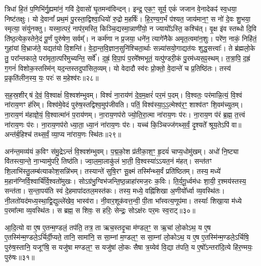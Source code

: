 त्रिधा॑ हि॒तं प॒णिभि॑र्गु॒ह्यमा॑नं॒ गवि॑ दे॒वासो॑ घृ॒तमन्व॑विन्दन्। 
इन्द्र॒ एक॒ꣳ॒ सूर्य॒ एकं॑ जजान वे॒नादेकꣴ॑ स्व॒धया॒ निष्ट॑तक्षुः। 
यो दे॒वानां᳚ प्रथ॒मं पु॒रस्ता॒द्विश्वा॒धियो॑ रु॒द्रो म॒हर्\mbox{}षिः॑। 
हि॒र॒ण्य॒ग॒र्भं प॑श्यत॒ जाय॑मान॒ꣳ॒ स नो॑ दे॒वः शु॒भया॒ स्मृत्या॒ संयु॑नक्तु। 
यस्मा॒त्परं॒ नाप॑र॒मस्ति॒ किञ्चि॒द्यस्मा॒न्नाणी॑यो॒ न ज्यायो᳚ऽस्ति॒ कश्चि॑त्। 
वृ॒क्ष इ॑व स्तब्धो दि॒वि ति॑ष्ठ॒त्येक॒स्तेने॒दं पू॒र्णं पुरु॑षेण॒ सर्वम्᳚। 
न कर्म॑णा न प्र॒जया॒ धने॑न॒ त्यागे॑नैके अमृत॒त्वमा॑न॒शुः। 
परे॑ण॒ नाकं॒ निहि॑तं॒ गुहा॑यां वि॒भ्राज॑ते॒ यद्यत॑यो वि॒शन्ति॑। 
वे॒दा॒न्त॒वि॒ज्ञान॒सुनि॑श्चिता॒र्थाः सन्न्या॑सयो॒गाद्यत॑यः शुद्ध॒सत्त्वाः᳚। 
ते ब्र॑ह्मलो॒के तु॒ परा᳚न्तकाले॒ परा॑मृता॒त्परि॑मुच्यन्ति॒ सर्वे᳚। 
द॒ह्रं॒ वि॒पा॒पं प॒रमे᳚श्मभूतं॒ यत्पु॑ण्डरी॒कं पु॒रम॑ध्यस॒ꣴ॒स्थम्। 
त॒त्रा॒पि॒ द॒ह्रं ग॒गनं॑ विशोक॒स्तस्मि॑न् यद॒न्तस्तदुपा॑सित॒व्यम्। 
यो वेदादौ स्व॑रः प्रो॒क्तो॒ वे॒दान्ते॑ च प्र॒तिष्ठि॑तः। 
तस्य॑ प्र॒कृति॑लीन॒स्य॒ यः॒ परः॑ स म॒हेश्व॑रः॥२८॥
\anuvakamend

स॒ह॒स्र॒शीर्‌षं दे॒वं॒ वि॒श्वाक्षं॑ वि॒श्वश॑म्भुवम्। 
विश्वं॑ ना॒राय॑णं दे॒व॒म॒क्षरं॑ पर॒मं प॒दम्। 
वि॒श्वतः॒ पर॑मान्नि॒त्यं॒ वि॒श्वं ना॑राय॒णꣳ ह॑रिम्। 
विश्व॑मे॒वेदं पुरु॑ष॒स्तद्विश्व॒मुप॑जीवति। 
पतिं॒ विश्व॑स्या॒ऽ॒ऽ॒त्मेश्व॑र॒ꣳ॒ शाश्व॑तꣳ शि॒वम॑च्युतम्। 
ना॒राय॒णं म॑हाज्ञे॒यं॒ वि॒श्वात्मा॑नं प॒राय॑णम्। 
ना॒राय॒णप॑रो ज्यो॒ति॒रा॒त्मा ना॑राय॒णः प॑रः। 
ना॒राय॒ण प॑रं ब्र॒ह्म॒ त॒त्त्वं ना॑राय॒णः प॑रः। 
ना॒राय॒णप॑रो ध्या॒ता॒ ध्या॒नं ना॑राय॒णः प॑रः। 
यच्च॑ कि॒ञ्चिज्ज॑गथ्स॒र्वं॒ दृ॒श्यते᳚ श्रूय॒तेऽपि॑ वा॥ 
अन्त॑र्ब॒हिश्च॑ तथ्स॒र्वं॒ व्या॒प्य ना॑राय॒णः स्थि॑तः॥२९॥

अन॑न्त॒मव्य॑यं क॒विꣳ स॑मु॒द्रेऽन्तं॑ वि॒श्वश॑म्भुवम्। 
प॒द्म॒को॒श प्र॑तीका॒श॒ꣳ॒ हृ॒दयं॑ चाप्य॒धोमु॑खम्। 
अधो॑ नि॒ष्ट्या वि॑तस्त्या॒न्ते॒ ना॒भ्यामु॑परि॒ तिष्ठ॑ति। 
ज्वा॒ल॒मा॒लाकु॑लं भा॒ती॒ वि॒श्वस्या॑ऽऽयत॒नं म॑हत्। 
सन्त॑तꣳ शि॒लाभि॑स्तु॒\-लम्ब॑त्याकोश॒सन्नि॑भम्। 
तस्यान्ते॑ सुषि॒रꣳ सू॒क्ष्मं तस्मि᳚न्थ्स॒र्वं प्रति॑ष्ठितम्। 
तस्य॒ मध्ये॑ म॒हान॑\-ग्निर्वि॒श्वार्चि॑र्वि॒श्वतो॑मुखः। 
सोऽग्र॑भु॒ग्विभ॑जन्ति॒ष्ठ॒न्नाहा॑रमज॒रः क॒विः। 
ति॒र्य॒गू॒र्ध्वम॑धः शा॒यी॒ र॒श्मय॑स्तस्य॒ सन्त॑ता। 
स॒न्ता॒पय॑ति स्वं दे॒हमा\-पा॑द\-तल॒\-मस्त॑कः। 
तस्य॒ मध्ये॒ वह्नि॑शिखा अ॒णीयो᳚र्ध्वा व्य॒वस्थि॑तः। 
नी॒लतो॑यद॑\-मध्य॒स्था॒द्वि॒द्युल्ले॑खेव॒ भास्व॑रा। 
नी॒वार॒शूक॑\-वत्त॒न्वी॒ पी॒ता भा᳚स्वत्य॒णूप॑मा। 
तस्याः᳚ शिखा॒या म॑ध्ये प॒रमा᳚त्मा व्य॒वस्थि॑तः। 
स ब्रह्म॒ स शिवः॒ स हरिः॒ सेन्द्रः॒ सोऽक्ष॑रः पर॒मः स्व॒राट्॥३०॥
\anuvakamend[ना॒रा॒य॒णः स्थि॑तो व्य॒वस्थि॑तश्च॒त्वारि॑ च]

आ॒दि॒त्यो वा ए॒ष ए॒तन्म॒ण्डलं॒ तप॑ति॒ तत्र॒ ता ऋच॒स्तदृ॒चा म॑ण्डल॒ꣳ॒ स ऋ॒चां लो॒कोऽथ॒ य ए॒ष ए॒तस्मि॑न्म॒ण्डले॒ऽर्चिर्दी॒प्यते॒ तानि॒ सामा॑नि॒ स सा॒म्नां म॒ण्डल॒ꣳ॒ स सा॒म्नां लो॒कोऽथ॒ य ए॒ष ए॒तस्मि॑न्म॒ण्डले॒ऽर्चिषि॒ पुरु॑ष॒स्तानि॒ यजूꣳ॑षि॒ स यजु॑षा मण्डल॒ꣳ॒ स यजु॑षां लो॒कः सैषा त्र॒य्येव॑ वि॒द्या त॑पति॒ य ए॒षो᳚ऽन्तरा॑दि॒त्ये हि॑र॒ण्मयः॒ पुरु॑षः॥३१॥
\anuvakamend


